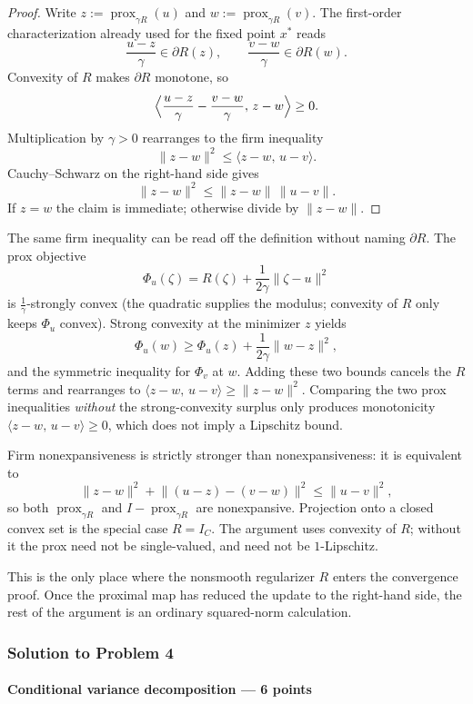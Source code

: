 \documentclass[11pt,a4paper]{article}
\DeclareMathOperator{\prox}{prox}
\theoremstyle{definition}
\begin{document}
\begin{proof}
Write $z:=\prox_{\gamma R}(u)$ and $w:=\prox_{\gamma R}(v)$. The first-order characterization already used for the fixed point $x^*$ reads
\[
\frac{u-z}{\gamma}\in\partial R(z),
\qquad
\frac{v-w}{\gamma}\in\partial R(w).
\]
Convexity of $R$ makes $\partial R$ monotone, so
\[
\Bigl\langle
\frac{u-z}{\gamma}-\frac{v-w}{\gamma},\,
z-w
\Bigr\rangle
\geq 0.
\]
Multiplication by $\gamma>0$ rearranges to the firm inequality
\[
\|z-w\|^2
\leq\langle z-w,\,u-v\rangle.
\]
Cauchy--Schwarz on the right-hand side gives
\[
\|z-w\|^2
\leq\|z-w\|\,\|u-v\|.
\]
If $z=w$ the claim is immediate; otherwise divide by $\|z-w\|$.
\end{proof}

The same firm inequality can be read off the definition without naming $\partial R$. The prox objective
\[
\Phi_u(\zeta)=R(\zeta)+\frac1{2\gamma}\|\zeta-u\|^2
\]
is $\frac1\gamma$-strongly convex (the quadratic supplies the modulus; convexity of $R$ only keeps $\Phi_u$ convex). Strong convexity at the minimizer $z$ yields
\[
\Phi_u(w)\geq\Phi_u(z)+\frac1{2\gamma}\|w-z\|^2,
\]
and the symmetric inequality for $\Phi_v$ at $w$. Adding these two bounds cancels the $R$ terms and rearranges to $\langle z-w,\,u-v\rangle\geq\|z-w\|^2$. Comparing the two prox inequalities \emph{without} the strong-convexity surplus only produces monotonicity $\langle z-w,\,u-v\rangle\geq 0$, which does not imply a Lipschitz bound.

Firm nonexpansiveness is strictly stronger than nonexpansiveness: it is equivalent to
\[
\|z-w\|^2
+\bigl\|(u-z)-(v-w)\bigr\|^2
\leq\|u-v\|^2,
\]
so both $\prox_{\gamma R}$ and $I-\prox_{\gamma R}$ are nonexpansive. Projection onto a closed convex set is the special case $R=I_C$. The argument uses convexity of $R$; without it the prox need not be single-valued, and need not be $1$-Lipschitz.

This is the only place where the nonsmooth regularizer $R$ enters the convergence proof. Once the proximal map has reduced the update to the right-hand side, the rest of the argument is an ordinary squared-norm calculation.

\subsubsection{Solution to Problem 4}\label{sol:spr2025-opt-4}

\paragraph{Conditional variance decomposition --- 6 points}
\end{document}
